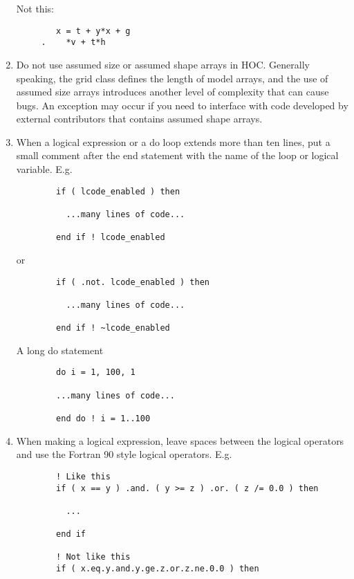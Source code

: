 \documentclass[letterpaper,12pt]{article}
\begin{document}
\begin{enumerate}
Not this:
\begin{verbatim}
        x = t + y*x + g
     .    *v + t*h
\end{verbatim}

\item Do not use assumed size or assumed shape arrays in HOC.  
Generally speaking, the grid class defines the length of model arrays, 
and the use of assumed size arrays introduces 
another level of complexity that can cause bugs.  An exception may occur
if you need to interface with code developed by external contributors that
contains assumed shape arrays.
\newline

\item When a logical expression or a do loop extends more than ten lines, put a
small comment after the end statement with the name of the loop or logical
variable.
E.g. \newline
\begin{verbatim}
        if ( lcode_enabled ) then

          ...many lines of code...

        end if ! lcode_enabled
\end{verbatim}

or 

\begin{verbatim}
        if ( .not. lcode_enabled ) then

          ...many lines of code...

        end if ! ~lcode_enabled
\end{verbatim}

A long do statement

\begin{verbatim}
        do i = 1, 100, 1

        ...many lines of code...

        end do ! i = 1..100
\end{verbatim}

\item When making a logical expression, leave spaces between the 
logical operators and use the Fortran 90 style logical operators. \newline
 E.g.
\begin{verbatim}
        ! Like this
        if ( x == y ) .and. ( y >= z ) .or. ( z /= 0.0 ) then

          ...

        end if

        ! Not like this
        if ( x.eq.y.and.y.ge.z.or.z.ne.0.0 ) then


\end{verbatim}
\end{enumerate}
\end{document}
